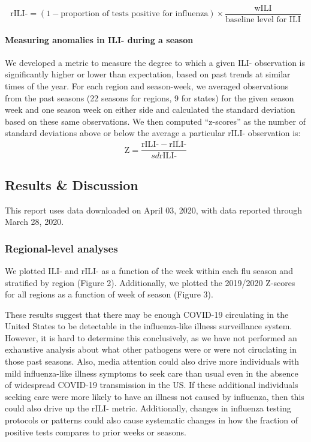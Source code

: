 \documentclass[]{article}
\let\oldparagraph\paragraph
\renewcommand{\paragraph}[1]{\oldparagraph{#1}\mbox{}}
\begin{document}
\[\text{rILI-} = (1 - \text{proportion of tests positive for influenza}) \times \frac{\text{wILI}}{\text{baseline level for ILI}}\]

\hypertarget{measuring-anomalies-in-ili--during-a-season}{%
\paragraph{Measuring anomalies in ILI- during a
season}\label{measuring-anomalies-in-ili--during-a-season}}

We developed a metric to measure the degree to which a given ILI-
observation is significantly higher or lower than expectation, based on
past trends at similar times of the year. For each region and
season-week, we averaged observations from the past seasons (22 seasons
for regions, 9 for states) for the given season week and one season week
on either side and calculated the standard deviation based on these same
observations. We then computed ``z-scores'' as the number of standard
deviations above or below the average a particular rILI- observation is:
\[\text{Z} =  \frac{\text{rILI-} - \overline{\text{rILI-}}}{sd{\text{rILI-}}}\]

\hypertarget{results-discussion}{%
\subsection{Results \& Discussion}\label{results-discussion}}

This report uses data downloaded on April 03, 2020, with data reported
through March 28, 2020.

\hypertarget{regional-level-analyses}{%
\subsubsection{Regional-level analyses}\label{regional-level-analyses}}

We plotted ILI- and rILI- as a function of the week within each flu
season and stratified by region (Figure 2). Additionally, we plotted the
2019/2020 Z-scores for all regions as a function of week of season
(Figure 3).

These results suggest that there may be enough COVID-19 circulating in
the United States to be detectable in the influenza-like illness
surveillance system. However, it is hard to determine this conclusively,
as we have not performed an exhaustive analysis about what other
pathogens were or were not ciruclating in those past seasons. Also,
media attention could also drive more individuals with mild
influenza-like illness symptoms to seek care than usual even in the
absence of widespread COVID-19 transmission in the US. If these
additional individuals seeking care were more likely to have an illness
not caused by influenza, then this could also drive up the rILI- metric.
Additionally, changes in influenza testing protocols or patterns could
also cause systematic changes in how the fraction of positive tests
compares to prior weeks or seasons.
\end{document}
